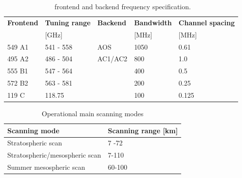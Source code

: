 \begin{table}
\caption{ \smr\ frontend and backend frequency specification.}
\label{table:config}
\begin{tabular}{|l|l|l|l|l|}
  \hline
  \textbf{Frontend} & \textbf{Tuning range} & \textbf{Backend} & \textbf{Bandwidth } & \textbf{Channel spacing} \\
                    & {[}GHz{]}             &                  & {[}MHz{]}           & {[}MHz{]}\\
  \hline
  549 A1            & 541 - 558             & AOS              & 1050                & 0.61\\
  \hline
  495 A2            & 486 - 504             & AC1/AC2          & 800                 & 1.0
 \\
 \cline{1-1}
 \cline{2-2}
 \cline{4-4}
 \cline{5-5}
  555 B1           & 547 - 564              &                 & 400                  & 0.5 \\
 \cline{1-1}
 \cline{2-2}
 \cline{4-4}
 \cline{5-5}
 572 B2            & 563 - 581              &                 & 200                  & 0.25 \\
 \cline{1-1}
 \cline{2-2}
 \cline{4-4}
 \cline{5-5}
  119 C           &  118.75                 &                 & 100                 & 0.125 \\
\hline
\end{tabular}
\end{table}

\begin{table}
\caption{Operational main scanning modes}
\label{table:scanpattern}
\begin{tabular}{|l|l|}
  \hline
  \textbf{Scanning mode} & \textbf{Scanning range {[}km{]}} \\
  \hline
  Stratospheric scan     &  7 -72 \\
 \hline
 Stratospheric/mesospheric scan &  7-110  \\
 \hline
 Summer mesospheric scan & 60-100 \\
 \hline
\end{tabular}
\end{table}




